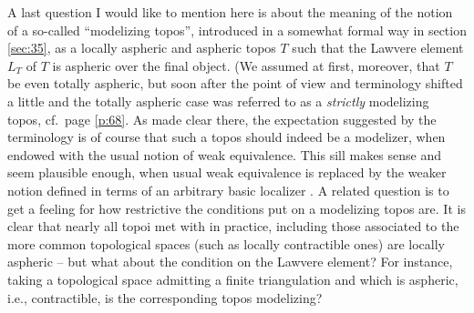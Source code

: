 A last question I would like to mention here is about the meaning of
the notion of a so-called ``modelizing topos'', introduced in a
somewhat formal way in section \ref{sec:35}, as a locally aspheric and
aspheric topos $T$ such that the Lawvere element $L_T$ of $T$ is
aspheric over the final object. (We assumed at first, moreover, that
$T$ be even totally aspheric, but soon after the point of view and
terminology shifted a little and the totally aspheric case was
referred to as a \emph{strictly} modelizing topos, cf.\ page
\ref{p:68}. As made clear there, the expectation suggested by the
terminology is of course that such a topos should indeed be a
modelizer, when endowed with the usual notion of weak
equivalence. This sill makes sense and seem plausible enough, when
usual weak equivalence is replaced by the weaker notion defined in
terms of an arbitrary basic localizer \scrW. A related question is to
get a feeling for how restrictive the conditions put on a modelizing
topos are. It is clear that nearly all topoi met with in practice,
including those associated to the more common topological spaces (such
as locally contractible ones) are locally aspheric -- but what about
the condition on the Lawvere element? For instance, taking a
topological space admitting a finite triangulation and which is
aspheric, i.e., contractible, is the corresponding topos modelizing?

\bigbreak

\presectionfill{}\par

